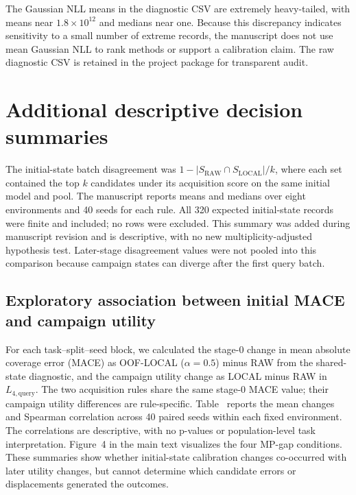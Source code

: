 \documentclass[11pt]{article}
\newcommand{\Lfourq}{\ensuremath{L_{4,\mathrm{query}}}\xspace}
\begin{document}
The Gaussian NLL means in the diagnostic CSV are extremely heavy-tailed, with means near \(1.8\times10^{12}\) and medians near one. Because this discrepancy indicates sensitivity to a small number of extreme records, the manuscript does not use mean Gaussian NLL to rank methods or support a calibration claim. The raw diagnostic CSV is retained in the project package for transparent audit.



\section{Additional descriptive decision summaries}
The initial-state batch disagreement was \(1-|S_{\mathrm{RAW}}\cap S_{\mathrm{LOCAL}}|/k\), where each set contained the top \(k\) candidates under its acquisition score on the same initial model and pool. The manuscript reports means and medians over eight environments and 40 seeds for each rule. All 320 expected initial-state records were finite and included; no rows were excluded. This summary was added during manuscript revision and is descriptive, with no new multiplicity-adjusted hypothesis test. Later-stage disagreement values were not pooled into this comparison because campaign states can diverge after the first query batch.



\subsection{Exploratory association between initial MACE and campaign utility}
For each task--split--seed block, we calculated the stage-0 change in mean absolute coverage error (MACE) as OOF-LOCAL ($\alpha=0.5$) minus RAW from the shared-state diagnostic, and the campaign utility change as LOCAL minus RAW in \Lfourq. The two acquisition rules share the same stage-0 MACE value; their campaign utility differences are rule-specific. Table~ reports the mean changes and Spearman correlation across 40 paired seeds within each fixed environment. The correlations are descriptive, with no p-values or population-level task interpretation. Figure~4 in the main text visualizes the four MP-gap conditions. These summaries show whether initial-state calibration changes co-occurred with later utility changes, but cannot determine which candidate errors or displacements generated the outcomes.
\end{document}
